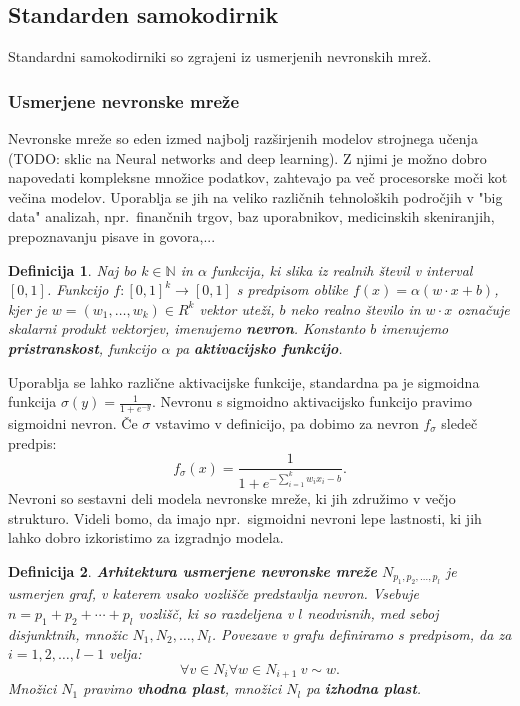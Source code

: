 \documentclass[12pt,a4paper]{article}
\newtheorem{definicija}{Definicija}
\begin{document}

\subsection{Standarden samokodirnik}
Standardni samokodirniki so zgrajeni iz usmerjenih nevronskih mrež.



\subsubsection{Usmerjene nevronske mreže}

Nevronske mreže so eden izmed najbolj razširjenih modelov strojnega učenja (TODO: sklic na Neural networks and deep learning). Z njimi je možno dobro napovedati kompleksne množice podatkov, zahtevajo pa več procesorske moči kot večina modelov. Uporablja se jih na veliko različnih tehnoloških področjih v "big data" analizah, npr.\ finančnih trgov, baz uporabnikov, medicinskih skeniranjih, prepoznavanju pisave in govora,... 

\begin{definicija}
Naj bo $k \in \mathbb{N}$ in $\alpha$ funkcija, ki slika iz realnih števil v interval $[0,1]$. 
Funkcijo $f: [0,1]^k \rightarrow [0,1]$ s predpisom oblike $f(x) = \alpha(w\cdot x + b)$, 
kjer je $w=(w_1,\ldots,w_k) \in R^k$ vektor uteži, $b$ neko realno število in $w \cdot x$ označuje skalarni produkt vektorjev, imenujemo \textbf{nevron}. 
Konstanto $b$ imenujemo \textbf{pristranskost}, funkcijo $\alpha$ pa \textbf{aktivacijsko funkcijo}.
\end{definicija}

Uporablja se lahko različne aktivacijske funkcije, standardna pa je sigmoidna funkcija $\sigma(y) = \frac{1}{1+e^{-y}}$. 
Nevronu s sigmoidno aktivacijsko funkcijo pravimo sigmoidni nevron. Če $\sigma$ vstavimo v definicijo, pa dobimo za nevron $f_{\sigma}$ sledeč predpis:
\[
f_{\sigma}(x)= \frac{1}{1+e^{-\sum_{i=1}^k w_i x_i - b}}.
\]
Nevroni so sestavni deli modela nevronske mreže, ki jih združimo v večjo strukturo. 
Videli bomo, da imajo npr.\ sigmoidni nevroni lepe lastnosti, ki jih lahko dobro izkoristimo za izgradnjo modela.

\begin{definicija}
\textbf{Arhitektura usmerjene nevronske mreže} $N_{p_1,p_2,\ldots,p_l}$ je usmerjen graf, v katerem vsako vozlišče predstavlja nevron. 
Vsebuje $n= p_1+p_2+\cdots+p_l$ vozlišč, ki so razdeljena v $l$ neodvisnih, med seboj disjunktnih, množic $N_1, N_2, \ldots, N_l$. 
Povezave v grafu definiramo s predpisom, da za $i=1,2,\ldots,l-1$ velja:
\[
\forall v \in N_i \forall w \in N_{i+1}\ v \sim w.
\]
Množici $N_1$ pravimo \textbf{vhodna plast}, množici $N_l$ pa \textbf{izhodna plast}.
\end{definicija}
\end{document}
